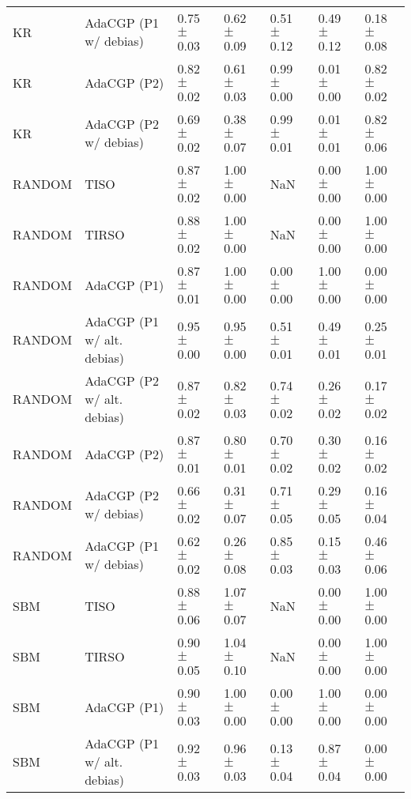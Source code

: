 \begin{tabular}{lllllll}
KR     &       AdaCGP (P1 w/ debias) &  0.75 $\pm$ 0.03 &  0.62 $\pm$ 0.09 &  0.51 $\pm$ 0.12 &  0.49 $\pm$ 0.12 &  0.18 $\pm$ 0.08 \\
KR     &                 AdaCGP (P2) &  0.82 $\pm$ 0.02 &  0.61 $\pm$ 0.03 &  0.99 $\pm$ 0.00 &  0.01 $\pm$ 0.00 &  0.82 $\pm$ 0.02 \\
KR     &       AdaCGP (P2 w/ debias) &  0.69 $\pm$ 0.02 &  0.38 $\pm$ 0.07 &  0.99 $\pm$ 0.01 &  0.01 $\pm$ 0.01 &  0.82 $\pm$ 0.06 \\
RANDOM &                        TISO &  0.87 $\pm$ 0.02 &  1.00 $\pm$ 0.00 &              NaN &  0.00 $\pm$ 0.00 &  1.00 $\pm$ 0.00 \\
RANDOM &                       TIRSO &  0.88 $\pm$ 0.02 &  1.00 $\pm$ 0.00 &              NaN &  0.00 $\pm$ 0.00 &  1.00 $\pm$ 0.00 \\
RANDOM &                 AdaCGP (P1) &  0.87 $\pm$ 0.01 &  1.00 $\pm$ 0.00 &  0.00 $\pm$ 0.00 &  1.00 $\pm$ 0.00 &  0.00 $\pm$ 0.00 \\
RANDOM &  AdaCGP (P1 w/ alt. debias) &  0.95 $\pm$ 0.00 &  0.95 $\pm$ 0.00 &  0.51 $\pm$ 0.01 &  0.49 $\pm$ 0.01 &  0.25 $\pm$ 0.01 \\
RANDOM &  AdaCGP (P2 w/ alt. debias) &  0.87 $\pm$ 0.02 &  0.82 $\pm$ 0.03 &  0.74 $\pm$ 0.02 &  0.26 $\pm$ 0.02 &  0.17 $\pm$ 0.02 \\
RANDOM &                 AdaCGP (P2) &  0.87 $\pm$ 0.01 &  0.80 $\pm$ 0.01 &  0.70 $\pm$ 0.02 &  0.30 $\pm$ 0.02 &  0.16 $\pm$ 0.02 \\
RANDOM &       AdaCGP (P2 w/ debias) &  0.66 $\pm$ 0.02 &  0.31 $\pm$ 0.07 &  0.71 $\pm$ 0.05 &  0.29 $\pm$ 0.05 &  0.16 $\pm$ 0.04 \\
RANDOM &       AdaCGP (P1 w/ debias) &  0.62 $\pm$ 0.02 &  0.26 $\pm$ 0.08 &  0.85 $\pm$ 0.03 &  0.15 $\pm$ 0.03 &  0.46 $\pm$ 0.06 \\
SBM    &                        TISO &  0.88 $\pm$ 0.06 &  1.07 $\pm$ 0.07 &              NaN &  0.00 $\pm$ 0.00 &  1.00 $\pm$ 0.00 \\
SBM    &                       TIRSO &  0.90 $\pm$ 0.05 &  1.04 $\pm$ 0.10 &              NaN &  0.00 $\pm$ 0.00 &  1.00 $\pm$ 0.00 \\
SBM    &                 AdaCGP (P1) &  0.90 $\pm$ 0.03 &  1.00 $\pm$ 0.00 &  0.00 $\pm$ 0.00 &  1.00 $\pm$ 0.00 &  0.00 $\pm$ 0.00 \\
SBM    &  AdaCGP (P1 w/ alt. debias) &  0.92 $\pm$ 0.03 &  0.96 $\pm$ 0.03 &  0.13 $\pm$ 0.04 &  0.87 $\pm$ 0.04 &  0.00 $\pm$ 0.00 \\

\end{tabular}

